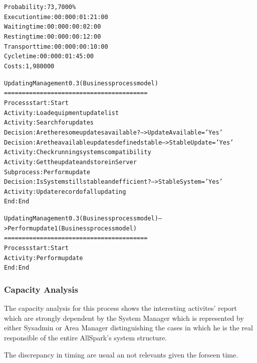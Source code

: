 \begin{alltt}
Probability:   73,7000\%
Execution time:  00:000:01:21:00
Waiting time:  00:000:00:02:00
Resting time:  00:000:00:12:00
Transport time:  00:000:00:10:00
Cycle time:  00:000:01:45:00
Costs:  1,980000

Updating Management 0.3 (Business process model)
========================================
Process start: Start
Activity: Load equipment update list
Activity: Search for updates
Decision: Are there some updates available? --> UpdateAvailable='Yes'
Decision: Are the available updates defined stable --> StableUpdate='Yes'
Activity: Check running systems compatibility
Activity: Get the update and store in Server
Subprocess: Perform update
Decision: Is System still stable and efficient? --> StableSystem='Yes'
Activity: Update record of all updating
End: End

Updating Management 0.3 (Business process model) --> Perform update 1 (Business process model)
========================================
Process start: Start
Activity: Perform update
End: End
\end{alltt}


\subsubsection{Capacity Analysis}
The capacity analysis for this process shows the interesting activites' report which are strongly dependent by the System Manager which is represented by either Sysadmin or Area Manager distinguishing the cases in which he is the real responsible of the entire AllSpark's system structure.

The discrepancy in timing are usual an not relevants given the forseen time.

